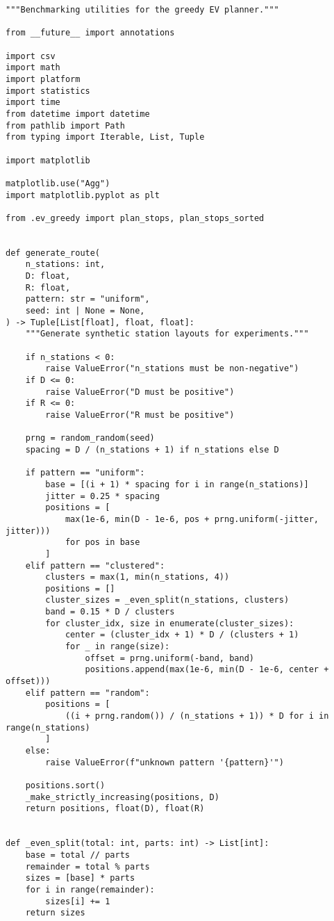 \begin{lstlisting}[caption={Benchmark and plotting harness},label={lst:ev-benchmark}]
"""Benchmarking utilities for the greedy EV planner."""

from __future__ import annotations

import csv
import math
import platform
import statistics
import time
from datetime import datetime
from pathlib import Path
from typing import Iterable, List, Tuple

import matplotlib

matplotlib.use("Agg")
import matplotlib.pyplot as plt

from .ev_greedy import plan_stops, plan_stops_sorted


def generate_route(
    n_stations: int,
    D: float,
    R: float,
    pattern: str = "uniform",
    seed: int | None = None,
) -> Tuple[List[float], float, float]:
    """Generate synthetic station layouts for experiments."""

    if n_stations < 0:
        raise ValueError("n_stations must be non-negative")
    if D <= 0:
        raise ValueError("D must be positive")
    if R <= 0:
        raise ValueError("R must be positive")

    prng = random_random(seed)
    spacing = D / (n_stations + 1) if n_stations else D

    if pattern == "uniform":
        base = [(i + 1) * spacing for i in range(n_stations)]
        jitter = 0.25 * spacing
        positions = [
            max(1e-6, min(D - 1e-6, pos + prng.uniform(-jitter, jitter)))
            for pos in base
        ]
    elif pattern == "clustered":
        clusters = max(1, min(n_stations, 4))
        positions = []
        cluster_sizes = _even_split(n_stations, clusters)
        band = 0.15 * D / clusters
        for cluster_idx, size in enumerate(cluster_sizes):
            center = (cluster_idx + 1) * D / (clusters + 1)
            for _ in range(size):
                offset = prng.uniform(-band, band)
                positions.append(max(1e-6, min(D - 1e-6, center + offset)))
    elif pattern == "random":
        positions = [
            ((i + prng.random()) / (n_stations + 1)) * D for i in range(n_stations)
        ]
    else:
        raise ValueError(f"unknown pattern '{pattern}'")

    positions.sort()
    _make_strictly_increasing(positions, D)
    return positions, float(D), float(R)


def _even_split(total: int, parts: int) -> List[int]:
    base = total // parts
    remainder = total % parts
    sizes = [base] * parts
    for i in range(remainder):
        sizes[i] += 1
    return sizes



\end{lstlisting}
